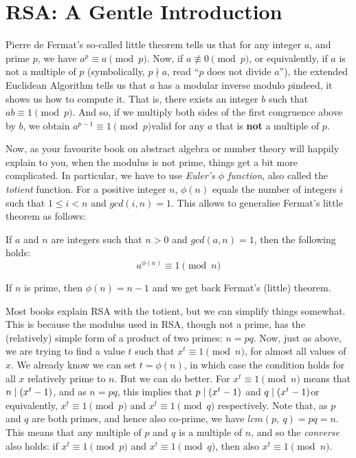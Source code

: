 \section{RSA: A Gentle Introduction}
  \label{sec:rsa_gentle_intro}
  Pierre de Fermat's so-called little theorem tells us that for any integer $a$, and prime $p$, we have $a^p \equiv a \pmod{p}$. Now, if $a\not\equiv 0 \pmod{p}$, or equivalently, if $a$ is not a multiple of $p$ (symbolically, $p\nmid a$, read ``$p$ does not divide $a$''), the extended Euclidean Algorithm tells us that $a$ has a modular inverse modulo $p$\emd indeed, it shows us how to compute it. That is, there exists an integer $b$ such that $ab \equiv 1 \pmod{p}$. And so, if we multiply both sides of the first congruence above by $b$, we obtain $a^{p-1} \equiv 1 \pmod{p}$\emd valid for any $a$ that is \textbf{not} a multiple of $p$.

  Now, as your favourite book on abstract algebra or number theory will happily explain to you, when the modulus is not prime, things get a bit more complicated. In particular, we have to use \emph{Euler's $\phi$ function}, also called the \emph{totient} function. For a positive integer $n$, $\phi(n)$ equals the number of integers $i$ such that $1 \le i < n$ and $gcd(i, n) = 1$. This allows to generalise Fermat's little theorem as follows:
  \begin{theorem}
    \label{thm:euler_theorem}
    If $a$ and $n$ are integers such that $n>0$ and $gcd(a, n) = 1$, then the following holds:
    \begin{equation}
      a^{\phi(n)} \equiv 1 \pmod{n}
    \end{equation}
  \end{theorem}
  \begin{remark}
    \label{rem:totient_for_prime}
    If $n$ is prime, then $\phi(n) = n-1$ and we get back Fermat's (little) theorem.
  \end{remark}

  \medskip

  \noindent Most books explain RSA with the totient, but we can simplify things somewhat. This is because the modulus used in RSA, though not a prime, has the (relatively) simple form of a product of two primes: $n = pq$. Now, just as above, we are trying to find a value $t$ such that $x^t \equiv 1 \pmod{n}$, for almost all values of $x$. We already know we can set $t = \phi(n)$, in which case the condition holds for all $x$ relatively prime to $n$. But we can do better. For $x^t \equiv 1 \pmod{n}$ means that $n\mathrel{|} (x^t-1)$, and as $n = pq$, this implies that $p\mathrel{|} (x^t-1)$ and $q\mathrel{|} (x^t-1)$\emd or equivalently, $x^t \equiv 1 \pmod{p}$ and $x^t \equiv 1 \pmod{q}$ respectively. Note that, as $p$ and $q$ are both primes, and hence also co-prime, we have $lcm(p,\ q) = pq = n$. This means that any multiple of $p$ and $q$ is a multiple of $n$, and so the \emph{converse} also holds: if $x^t \equiv 1 \pmod{p}$ and $x^t \equiv 1 \pmod{q}$, then also $x^t \equiv 1 \pmod{n}$.

